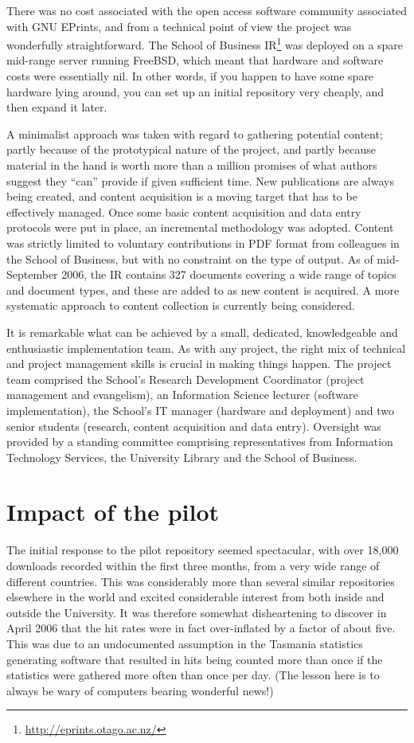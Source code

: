 \documentclass[12pt,pdftex,a4paper,titlepage]{article}
\begin{document}
There was no cost associated with the open access software community associated with GNU EPrints, and from a technical point of view the project was wonderfully straightforward. The School of Business IR\footnote{\url{http://eprints.otago.ac.nz/}} was deployed on a spare mid-range server running FreeBSD, which meant that hardware and software costs were essentially nil. In other words, if you happen to have some spare hardware lying around, you can set up an initial repository very cheaply, and then expand it later.

A minimalist approach was taken with regard to gathering potential content; partly because of the prototypical nature of the project, and partly because material in the hand is worth more than a million promises of what authors suggest they ``can'' provide if given sufficient time. New publications are always being created, and content acquisition is a moving target that has to be effectively managed. Once some basic content acquisition and data entry protocols were put in place, an incremental methodology was adopted. Content was strictly limited to voluntary contributions in PDF format from colleagues in the School of Business, but with no constraint on the type of output. As of mid-September 2006, the IR contains 327 documents covering a wide range of topics and document types, and these are added to as new content is acquired. A more systematic approach to content collection is currently being considered.

It is remarkable what can be achieved by a small, dedicated, knowledgeable and enthusiastic implementation team. As with any project, the right mix of technical and project management skills is crucial in making things happen. The project team comprised the School's Research Development Coordinator (project management and evangelism), an Information Science lecturer (software implementation), the School's IT manager (hardware and deployment) and two senior students (research, content acquisition and data entry). Oversight was provided by a standing committee comprising representatives from Information Technology Services, the University Library and the School of Business.


\section{Impact of the pilot}

The initial response to the pilot repository seemed spectacular, with over 18,000 downloads recorded within the first three months, from a very wide range of different countries. This was considerably more than several similar repositories elsewhere in the world and excited considerable interest from both inside and outside the University. It was therefore somewhat disheartening to discover in April 2006 that the hit rates were in fact over-inflated by a factor of about five. This was due to an undocumented assumption in the Tasmania statistics generating software \cite{Sale-A-2006-stats} that resulted in hits being counted more than once if the statistics were gathered more often than once per day. (The lesson here is to always be wary of computers bearing wonderful news!)
\end{document}
